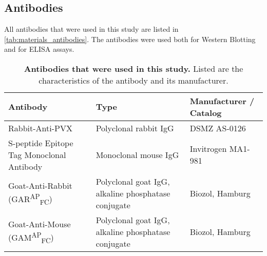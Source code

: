 \subsection{Antibodies}
All antibodies that were used in this study are listed in \autoref{tab:materials_antibodies}. The antibodies were used both for Western Blotting and for ELISA assays. 
\begin{table}[h]
    \centering
    \caption{\textbf{Antibodies that were used in this study.} Listed are the characteristics of the antibody and its manufacturer. }
    \begin{tabular}{p{4cm} p{5cm} p{4cm}}
    \toprule
    \textbf{Antibody} & \textbf{Type} & \textbf{Manufacturer / Catalog} \\
    \midrule
    Rabbit-Anti-PVX & Polyclonal rabbit IgG & DSMZ AS-0126 \\
    S-peptide Epitope Tag Monoclonal Antibody & Monoclonal mouse IgG & Invitrogen MA1-981 \\
    Goat-Anti-Rabbit (GAR\textsuperscript{AP}\textsubscript{FC}) & Polyclonal goat IgG, alkaline phosphatase conjugate & Biozol, Hamburg \\
    Goat-Anti-Mouse (GAM\textsuperscript{AP}\textsubscript{FC}) & Polyclonal goat IgG, alkaline phosphatase conjugate & Biozol, Hamburg \\
    \bottomrule
    \end{tabular}
    \label{tab:materials_antibodies}
\end{table}
\FloatBarrier
